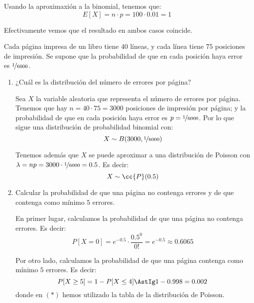 \begin{ejercicio}
\begin{enumerate}
        Usando la aproximaxión a la binomial, tenemos que:
        \begin{equation*}
            E[X] = n \cdot p = 100 \cdot 0.01 = 1
        \end{equation*}

        Efectivamente vemos que el resultado en ambos casos coincide.
    \end{enumerate}
\end{ejercicio}

\begin{ejercicio}
    Cada página impresa de un libro tiene $40$ líneas, y cada línea tiene $75$ posiciones de impresión. Se
    supone que la probabilidad de que en cada posición haya error es $\nicefrac{1}{6000}$.
    \begin{enumerate}
        \item ¿Cuál es la distribución del número de errores por página?
        
        Sea $X$ la variable aleatoria que representa el número de errores por página. Tenemos que hay $n=40\cdot 75 = 3000$ posiciones de impresión por página; y la probabilidad de que en cada posición haya error es $p=\nicefrac{1}{6000}$. Por lo que sigue una distribución de probabilidad binomial con:
        \begin{equation*}
            X \sim B(3000,\nicefrac{1}{6000})
        \end{equation*}

        Tenemos además que $X$ se puede aproximar a una distribución de Poisson con $\lambda = np = 3000 \cdot \nicefrac{1}{6000} = 0.5$. Es decir:
        \begin{equation*}
            X \sim \cc{P}(0.5)
        \end{equation*}


        \item Calcular la probabilidad de que una página no contenga errores y de que contenga como mínimo
        $5$ errores.

        En primer lugar, calculamos la probabilidad de que una página no contenga errores. Es decir:
        \begin{equation*}
            P[X=0] = e^{-0.5} \cdot \dfrac{0.5^0}{0!} = e^{-0.5} \approx 0.6065
        \end{equation*}

        Por otro lado, calculamos la probabilidad de que una página contenga como mínimo $5$ errores. Es decir:
        \begin{equation*}
            P[X\geq 5] = 1 - P[X\leq 4] \AstIg 1 - 0.998 = 0.002
        \end{equation*}
        donde en $(\ast)$ hemos utilizado la tabla de la distribución de Poisson.



\end{enumerate}
\end{ejercicio}

